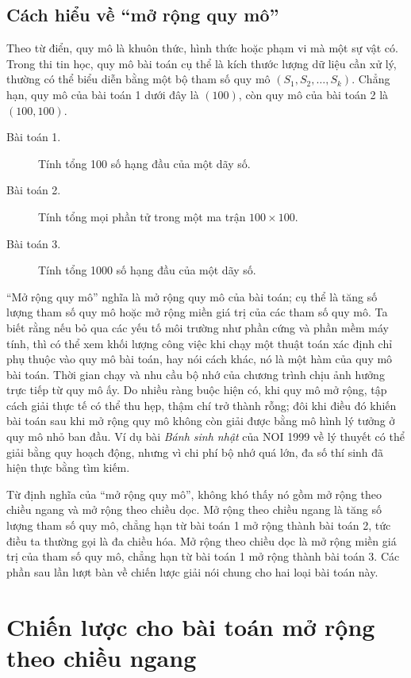 \documentclass[11pt]{article}
\begin{document}
\subsection{Cách hiểu về ``mở rộng quy mô''}

Theo từ điển, quy mô là khuôn thức, hình thức hoặc phạm vi mà một sự vật có.
Trong thi tin học, quy mô bài toán cụ thể là kích thước lượng dữ liệu cần xử
lý, thường có thể biểu diễn bằng một bộ tham số quy mô
\((S_1,S_2,\ldots,S_k)\). Chẳng hạn, quy mô của bài toán 1 dưới đây là
\((100)\), còn quy mô của bài toán 2 là \((100,100)\).

\begin{description}
  \item[Bài toán 1.] Tính tổng 100 số hạng đầu của một dãy số.
  \item[Bài toán 2.] Tính tổng mọi phần tử trong một ma trận \(100\times100\).
  \item[Bài toán 3.] Tính tổng 1000 số hạng đầu của một dãy số.
\end{description}

``Mở rộng quy mô'' nghĩa là mở rộng quy mô của bài toán; cụ thể là tăng số
lượng tham số quy mô hoặc mở rộng miền giá trị của các tham số quy mô. Ta
biết rằng nếu bỏ qua các yếu tố môi trường như phần cứng và phần mềm máy
tính, thì có thể xem khối lượng công việc khi chạy một thuật toán xác định
chỉ phụ thuộc vào quy mô bài toán, hay nói cách khác, nó là một hàm của quy
mô bài toán. Thời gian chạy và nhu cầu bộ nhớ của chương trình chịu ảnh hưởng
trực tiếp từ quy mô ấy. Do nhiều ràng buộc hiện có, khi quy mô mở rộng, tập
cách giải thực tế có thể thu hẹp, thậm chí trở thành rỗng; đôi khi điều đó
khiến bài toán sau khi mở rộng quy mô không còn giải được bằng mô hình lý
tưởng ở quy mô nhỏ ban đầu. Ví dụ bài \textit{Bánh sinh nhật} của NOI 1999
về lý thuyết có thể giải bằng quy hoạch động, nhưng vì chi phí bộ nhớ quá
lớn, đa số thí sinh đã hiện thực bằng tìm kiếm.

Từ định nghĩa của ``mở rộng quy mô'', không khó thấy nó gồm mở rộng theo
chiều ngang và mở rộng theo chiều dọc. Mở rộng theo chiều ngang là tăng số
lượng tham số quy mô, chẳng hạn từ bài toán 1 mở rộng thành bài toán 2, tức
điều ta thường gọi là đa chiều hóa. Mở rộng theo chiều dọc là mở rộng miền
giá trị của tham số quy mô, chẳng hạn từ bài toán 1 mở rộng thành bài toán 3.
Các phần sau lần lượt bàn về chiến lược giải nói chung cho hai loại bài toán
này.

\section{Chiến lược cho bài toán mở rộng theo chiều ngang}
\end{document}
